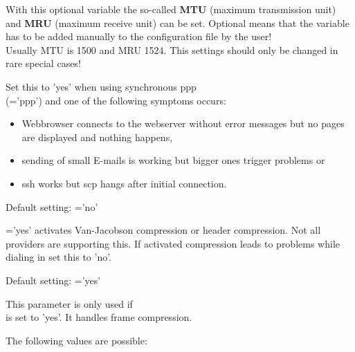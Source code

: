 \begin{description}
  With this optional variable the so-called \textbf{MTU} (maximum transmission unit) 
  and \textbf{MRU} (maximum receive unit) can be set. Optional means that the variable 
  has to be added manually to the configuration file by the user! \\ 
  Usually MTU is 1500 and MRU 1524. This settings should only be changed in
  rare special cases!


Set this to 'yes' when using synchronous ppp \\ (='ppp') and 
one of the following symptoms occurs:
\begin{itemize}
\item Webbrowser connects to the webserver without error messages but no pages 
  are displayed and nothing happens,
\item sending of small \mbox{E-mails} is working but bigger ones trigger problems or
\item ssh works but scp hangs after initial connection.
\end{itemize}

  Default setting: ='no'

  
  ='yes' activates Van-Jacobson compression or 
  header compression. Not all providers are supporting this. If activated compression 
  leads to problems while dialing in set this to 'no'.
  
  Default setting: ='yes'


  
  This parameter is only used if \\  is set to 'yes'. 
  It handles frame compression.
  
  The following values are possible:


\end{description}
